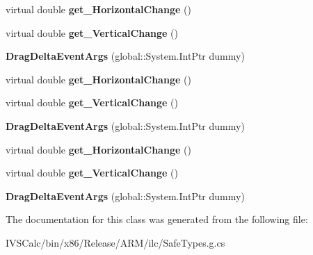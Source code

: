 \begin{DoxyCompactItemize}
virtual double {\bfseries get\+\_\+\+Horizontal\+Change} ()
\item 
\mbox{\label{class_windows_1_1_u_i_1_1_xaml_1_1_controls_1_1_primitives_1_1_drag_delta_event_args_a9ce87ad7ca3247a1a1126478f6cb19f5}} 
virtual double {\bfseries get\+\_\+\+Vertical\+Change} ()
\item 
\mbox{\label{class_windows_1_1_u_i_1_1_xaml_1_1_controls_1_1_primitives_1_1_drag_delta_event_args_a95104016ef118812b7535253daf022fa}} 
{\bfseries Drag\+Delta\+Event\+Args} (global\+::\+System.\+Int\+Ptr dummy)
\item 
\mbox{\label{class_windows_1_1_u_i_1_1_xaml_1_1_controls_1_1_primitives_1_1_drag_delta_event_args_a4f2eba3dff77b410578af59390c787f4}} 
virtual double {\bfseries get\+\_\+\+Horizontal\+Change} ()
\item 
\mbox{\label{class_windows_1_1_u_i_1_1_xaml_1_1_controls_1_1_primitives_1_1_drag_delta_event_args_a9ce87ad7ca3247a1a1126478f6cb19f5}} 
virtual double {\bfseries get\+\_\+\+Vertical\+Change} ()
\item 
\mbox{\label{class_windows_1_1_u_i_1_1_xaml_1_1_controls_1_1_primitives_1_1_drag_delta_event_args_a95104016ef118812b7535253daf022fa}} 
{\bfseries Drag\+Delta\+Event\+Args} (global\+::\+System.\+Int\+Ptr dummy)
\item 
\mbox{\label{class_windows_1_1_u_i_1_1_xaml_1_1_controls_1_1_primitives_1_1_drag_delta_event_args_a4f2eba3dff77b410578af59390c787f4}} 
virtual double {\bfseries get\+\_\+\+Horizontal\+Change} ()
\item 
\mbox{\label{class_windows_1_1_u_i_1_1_xaml_1_1_controls_1_1_primitives_1_1_drag_delta_event_args_a9ce87ad7ca3247a1a1126478f6cb19f5}} 
virtual double {\bfseries get\+\_\+\+Vertical\+Change} ()
\item 
\mbox{\label{class_windows_1_1_u_i_1_1_xaml_1_1_controls_1_1_primitives_1_1_drag_delta_event_args_a95104016ef118812b7535253daf022fa}} 
{\bfseries Drag\+Delta\+Event\+Args} (global\+::\+System.\+Int\+Ptr dummy)
\end{DoxyCompactItemize}


The documentation for this class was generated from the following file\+:\begin{DoxyCompactItemize}
\item 
I\+V\+S\+Calc/bin/x86/\+Release/\+A\+R\+M/ilc/Safe\+Types.\+g.\+cs\end{DoxyCompactItemize}
